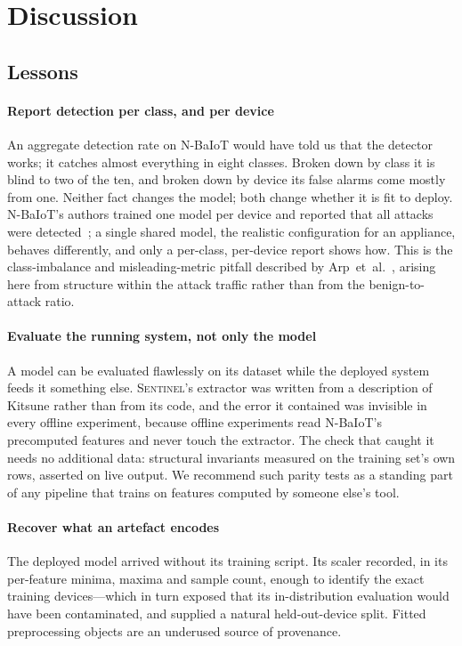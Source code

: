 \section{Discussion}
\label{sec:discussion}

\subsection{Lessons}

\paragraph{Report detection per class, and per device}
An aggregate detection rate on N-BaIoT would have told us that the detector
works; it catches almost everything in eight classes. Broken down by class it
is blind to two of the ten, and broken down by device its false alarms come
mostly from one. Neither fact changes the model; both change whether it is fit
to deploy. N-BaIoT's authors trained one model per device and reported that
all attacks were detected~\cite{meidan2018nbaiot}; a single shared model, the
realistic configuration for an appliance, behaves differently, and only a
per-class, per-device report shows how. This is the class-imbalance and
misleading-metric pitfall described by Arp~et~al.~\cite{arp2022dosdonts},
arising here from structure within the attack traffic rather than from the
benign-to-attack ratio.

\paragraph{Evaluate the running system, not only the model}
A model can be evaluated flawlessly on its dataset while the deployed system
feeds it something else. \textsc{Sentinel}'s extractor was written from a
description of Kitsune rather than from its code, and the error it contained
was invisible in every offline experiment, because offline experiments read
N-BaIoT's precomputed features and never touch the extractor. The check that
caught it needs no additional data: structural invariants measured on the
training set's own rows, asserted on live output. We recommend such parity
tests as a standing part of any pipeline that trains on features computed by
someone else's tool.

\paragraph{Recover what an artefact encodes}
The deployed model arrived without its training script. Its scaler recorded,
in its per-feature minima, maxima and sample count, enough to identify the
exact training devices---which in turn exposed that its in-distribution
evaluation would have been contaminated, and supplied a natural held-out-device
split. Fitted preprocessing objects are an underused source of provenance.

